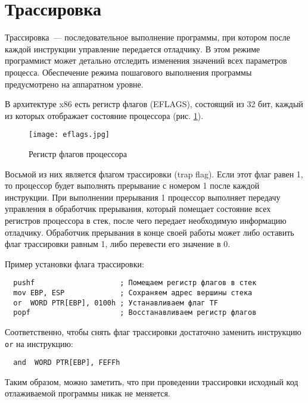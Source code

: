 
\section{Трассировка}
Трассировка~--- последовательное выполнение программы, при котором после каждой
инструкции управление передается отладчику. В этом режиме программист может
детально отследить изменения значений всех параметров процесса. Обеспечение
режима пошагового выполнения программы предусмотрено на аппаратном уровне.

В архитектуре x86 есть регистр флагов (EFLAGS), состоящий из 32 бит, каждый из
которых отображает состояние процессора (рис.  \ref{fig:eflags}).
\begin{figure}[htpb]
  \centering
  \texttt{[image: eflags.jpg]}
  \caption{Регистр флагов процессора}
  \label{fig:eflags}
\end{figure}
Восьмой из них является флагом трассировки (trap flag). Если этот флаг равен 1,
то процессор будет выполнять прерывание с номером 1 после каждой инструкции. При
выполнении прерывания 1 процессор выполняет передачу управления в обработчик
прерывания, который помещает состояние всех регистров процессора в стек, после
чего передает необходимую информацию отладчику. Обработчик прерывания в конце
своей работы может либо оставить флаг трассировки равным 1, либо перевести его
значение в 0.

Пример установки флага трассировки:
\begin{verbatim}
  pushf                    ; Помещаем регистр флагов в стек
  mov EBP, ESP             ; Сохраняем адрес вершины стека
  or  WORD PTR[EBP], 0100h ; Устанавливаем флаг TF
  popf                     ; Восстанавливаем регистр флагов
\end{verbatim}
Соответственно, чтобы снять флаг трассировки достаточно заменить инструкцию
\verb!or! на инструкцию:
\begin{verbatim}
  and  WORD PTR[EBP], FEFFh
\end{verbatim}

Таким образом, можно заметить, что при проведении трассировки исходный код
отлаживаемой программы никак не меняется.

